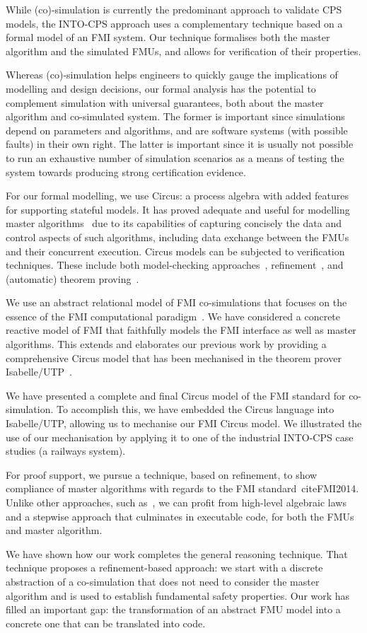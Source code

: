 While (co)-simulation is currently the predominant approach to validate CPS models, the INTO-CPS approach uses a complementary technique based on a formal model of an FMI system. Our technique formalises both the master algorithm and the simulated FMUs, and allows for verification of their properties.

Whereas (co)-simulation helps engineers to quickly gauge the implications of modelling and design decisions, our formal analysis has the potential to complement simulation with universal guarantees, both about the master algorithm and co-simulated system. The former is important since simulations depend on parameters and algorithms, and are software systems (with possible faults) in their own right. The latter is important since it is usually not possible to run an exhaustive number of simulation scenarios as a means of testing the system towards producing strong certification evidence.

For our formal modelling, we use Circus: a process algebra with added features for supporting stateful models. It has proved adequate and useful for modelling master algorithms~\cite{CavalcantiWA16} due to its capabilities of capturing concisely the data and control aspects of such algorithms, including data exchange between the FMUs and their concurrent execution. Circus models can be subjected to verification techniques. These include both model-checking approaches~\cite{GrumbergV2008}, refinement~\cite{CavalcantiSW2003}, and (automatic) theorem proving~\cite{OliveiraCW2009}.

We use an abstract relational model of FMI co-simulations that focuses on the essence of the FMI computational paradigm~\cite{ZeydaOFC17}. We have considered a concrete reactive model of FMI that faithfully models the FMI interface as well as master algorithms. This extends and elaborates our previous work by providing a comprehensive Circus model that has been mechanised in the theorem prover Isabelle/UTP~\cite{FosterZW2016}.

We have presented a complete and final Circus model of the FMI standard for co-simulation. To accomplish this, we have embedded the Circus language into Isabelle/UTP, allowing us to mechanise our FMI Circus model.  We illustrated the use of our mechanisation by applying it to one of the industrial INTO-CPS case studies (a railways system).

For proof support, we pursue a technique, based on refinement, to show compliance of master algorithms with regards to the FMI standard~cite{FMI2014}. Unlike other approaches, such as~\cite{Broman2013}, we can profit from high-level algebraic laws and a stepwise approach that culminates in executable code, for both the FMUs and master algorithm.

We have shown how our work completes the general reasoning technique. That technique proposes a refinement-based approach: we start with a discrete abstraction of a co-simulation that does not need to consider the master algorithm and is used to establish fundamental safety properties. Our work has filled an important gap: the transformation of an abstract FMU model into a concrete one that can be translated into code.
